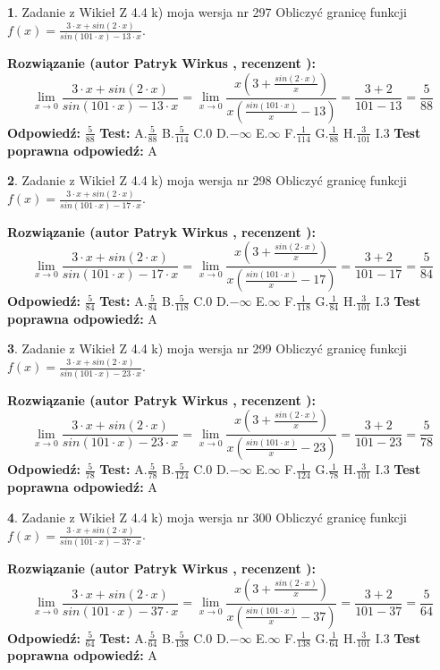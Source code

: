\documentclass[12pt, a4paper]{article}
\theoremstyle{definition} %
\newtheorem{zad}{}
\newcommand{\zadStart}[1]{\begin{zad}#1\newline}
\newcommand{\zadStop}{\end{zad}}
\newcommand{\rozwStart}[2]{\noindent \textbf{Rozwiązanie (autor #1 , recenzent #2): }\newline}
\newcommand{\rozwStop}{\newline}
\newcommand{\odpStart}{\noindent \textbf{Odpowiedź:}\newline}
\newcommand{\odpStop}{\newline}
\newcommand{\testStart}{\noindent \textbf{Test:}\newline}
\newcommand{\testStop}{\newline}
\newcommand{\kluczStart}{\noindent \textbf{Test poprawna odpowiedź:}\newline}
\newcommand{\kluczStop}{\newline}
\begin{document}
\zadStart{Zadanie z Wikieł Z 4.4 k) moja wersja nr 297}
Obliczyć granicę funkcji $f(x)=\frac{3\cdot x +sin(2\cdot x)}{sin(101\cdot x) -13\cdot x}$.
\zadStop
\rozwStart{Patryk Wirkus}{}
$$\lim\limits_{x\to 0}\frac{3\cdot x +sin(2\cdot x)}{sin(101\cdot x) -13\cdot x}
=\lim\limits_{x\to 0}\frac{x(3+\frac{sin(2\cdot x)}{x})}{x(\frac{sin(101\cdot x)}{x}-13)}
=\frac{3+2}{101-13} = \frac{5}{88}$$
\rozwStop
\odpStart
$\frac{5}{88}$
\odpStop
\testStart
A.$\frac{5}{88}$
B.$\frac{5}{114}$
C.$0$
D.$-\infty$
E.$\infty$
F.$\frac{1}{114}$
G.$\frac{1}{88}$
H.$\frac{3}{101}$
I.$3$
\testStop
\kluczStart
A
\kluczStop



\zadStart{Zadanie z Wikieł Z 4.4 k) moja wersja nr 298}
Obliczyć granicę funkcji $f(x)=\frac{3\cdot x +sin(2\cdot x)}{sin(101\cdot x) -17\cdot x}$.
\zadStop
\rozwStart{Patryk Wirkus}{}
$$\lim\limits_{x\to 0}\frac{3\cdot x +sin(2\cdot x)}{sin(101\cdot x) -17\cdot x}
=\lim\limits_{x\to 0}\frac{x(3+\frac{sin(2\cdot x)}{x})}{x(\frac{sin(101\cdot x)}{x}-17)}
=\frac{3+2}{101-17} = \frac{5}{84}$$
\rozwStop
\odpStart
$\frac{5}{84}$
\odpStop
\testStart
A.$\frac{5}{84}$
B.$\frac{5}{118}$
C.$0$
D.$-\infty$
E.$\infty$
F.$\frac{1}{118}$
G.$\frac{1}{84}$
H.$\frac{3}{101}$
I.$3$
\testStop
\kluczStart
A
\kluczStop



\zadStart{Zadanie z Wikieł Z 4.4 k) moja wersja nr 299}
Obliczyć granicę funkcji $f(x)=\frac{3\cdot x +sin(2\cdot x)}{sin(101\cdot x) -23\cdot x}$.
\zadStop
\rozwStart{Patryk Wirkus}{}
$$\lim\limits_{x\to 0}\frac{3\cdot x +sin(2\cdot x)}{sin(101\cdot x) -23\cdot x}
=\lim\limits_{x\to 0}\frac{x(3+\frac{sin(2\cdot x)}{x})}{x(\frac{sin(101\cdot x)}{x}-23)}
=\frac{3+2}{101-23} = \frac{5}{78}$$
\rozwStop
\odpStart
$\frac{5}{78}$
\odpStop
\testStart
A.$\frac{5}{78}$
B.$\frac{5}{124}$
C.$0$
D.$-\infty$
E.$\infty$
F.$\frac{1}{124}$
G.$\frac{1}{78}$
H.$\frac{3}{101}$
I.$3$
\testStop
\kluczStart
A
\kluczStop



\zadStart{Zadanie z Wikieł Z 4.4 k) moja wersja nr 300}
Obliczyć granicę funkcji $f(x)=\frac{3\cdot x +sin(2\cdot x)}{sin(101\cdot x) -37\cdot x}$.
\zadStop
\rozwStart{Patryk Wirkus}{}
$$\lim\limits_{x\to 0}\frac{3\cdot x +sin(2\cdot x)}{sin(101\cdot x) -37\cdot x}
=\lim\limits_{x\to 0}\frac{x(3+\frac{sin(2\cdot x)}{x})}{x(\frac{sin(101\cdot x)}{x}-37)}
=\frac{3+2}{101-37} = \frac{5}{64}$$
\rozwStop
\odpStart
$\frac{5}{64}$
\odpStop
\testStart
A.$\frac{5}{64}$
B.$\frac{5}{138}$
C.$0$
D.$-\infty$
E.$\infty$
F.$\frac{1}{138}$
G.$\frac{1}{64}$
H.$\frac{3}{101}$
I.$3$
\testStop
\kluczStart
A
\kluczStop
\end{document}

